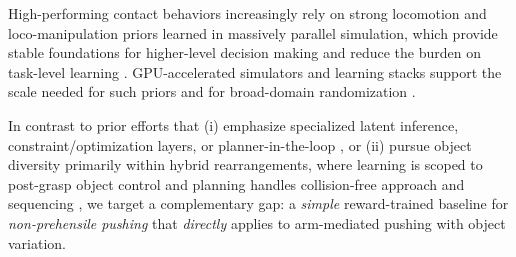High-performing contact behaviors increasingly rely on strong locomotion and loco-manipulation priors learned in massively parallel simulation, which provide stable foundations for higher-level decision making and reduce the burden on task-level learning \cite{2025relic,Rudin2021WalkMinutes,Kumar2021RMA}. GPU-accelerated simulators and learning stacks support the scale needed 
for such priors and for broad-domain randomization \cite{Makoviychuk2021IsaacGym,Baginski2025IsaacLab}. %

In contrast to prior efforts that (i) emphasize specialized latent inference, constraint/optimization layers, or planner-in-the-loop %
\cite{Jeon2023WholeBodyQuadruped,dadiotis2025dynamic}, or (ii) pursue object diversity primarily within hybrid rearrangements, where learning is scoped to post-grasp object control and planning handles collision-free approach and sequencing \cite{li2025robotmoverlearninglargeobjects}, we target a complementary gap: a \emph{simple} reward-trained baseline for \emph{non-prehensile pushing} that \emph{directly} applies to arm-mediated pushing with object variation. 




